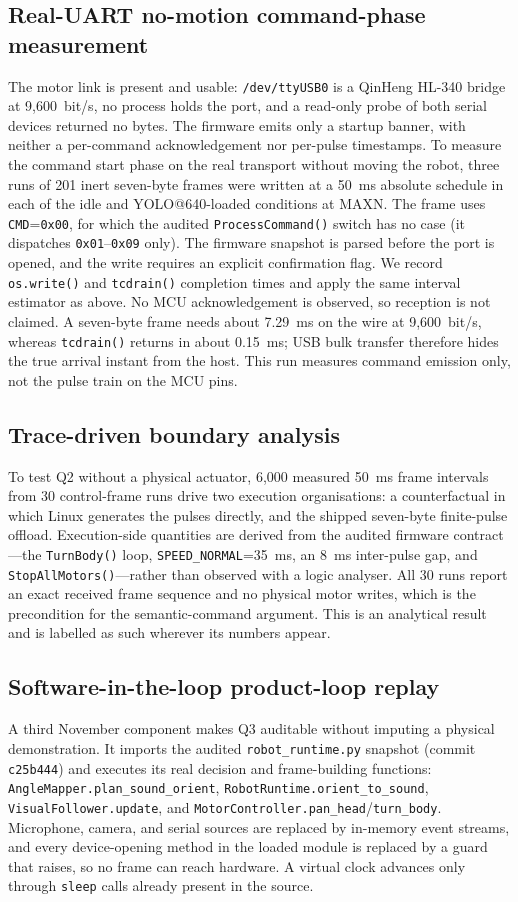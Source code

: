 \documentclass[conference]{IEEEtran}
\newcommand{\code}[1]{\texttt{#1}}
\begin{document}
\subsection{Real-UART no-motion command-phase measurement}
The motor link is present and usable: \code{/dev/ttyUSB0} is a QinHeng HL-340 bridge at 9,600~bit/s, no process holds the port, and a read-only probe of both serial devices returned no bytes. The firmware emits only a startup banner, with neither a per-command acknowledgement nor per-pulse timestamps. To measure the command start phase on the real transport without moving the robot, three runs of 201 inert seven-byte frames were written at a 50~ms absolute schedule in each of the idle and YOLO@640-loaded conditions at MAXN. The frame uses \code{CMD}=\code{0x00}, for which the audited \code{ProcessCommand()} switch has no case (it dispatches \code{0x01}--\code{0x09} only). The firmware snapshot is parsed before the port is opened, and the write requires an explicit confirmation flag. We record \code{os.write()} and \code{tcdrain()} completion times and apply the same interval estimator as above. No MCU acknowledgement is observed, so reception is not claimed. A seven-byte frame needs about 7.29~ms on the wire at 9,600~bit/s, whereas \code{tcdrain()} returns in about 0.15~ms; USB bulk transfer therefore hides the true arrival instant from the host. This run measures command emission only, not the pulse train on the MCU pins.

\subsection{Trace-driven boundary analysis}
To test Q2 without a physical actuator, 6,000 measured 50~ms frame intervals from 30 control-frame runs drive two execution organisations: a counterfactual in which Linux generates the pulses directly, and the shipped seven-byte finite-pulse offload. Execution-side quantities are derived from the audited firmware contract---the \code{TurnBody()} loop, \code{SPEED\_NORMAL}=35~ms, an 8~ms inter-pulse gap, and \code{StopAllMotors()}---rather than observed with a logic analyser. All 30 runs report an exact received frame sequence and no physical motor writes, which is the precondition for the semantic-command argument. This is an analytical result and is labelled as such wherever its numbers appear.

\subsection{Software-in-the-loop product-loop replay}
A third November component makes Q3 auditable without imputing a physical demonstration. It imports the audited \code{robot\_runtime.py} snapshot (commit \code{c25b444}) and executes its real decision and frame-building functions: \code{AngleMapper.plan\_sound\_orient}, \code{RobotRuntime.orient\_to\_sound}, \code{VisualFollower.update}, and \code{MotorController.pan\_head}/\code{turn\_body}. Microphone, camera, and serial sources are replaced by in-memory event streams, and every device-opening method in the loaded module is replaced by a guard that raises, so no frame can reach hardware. A virtual clock advances only through \code{sleep} calls already present in the source.
\end{document}
